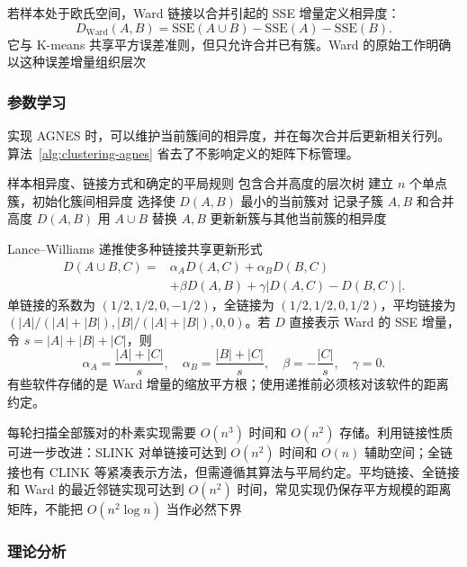 若样本处于欧氏空间，Ward 链接以合并引起的 SSE 增量定义相异度：
\[
 D_{\mathrm{Ward}}(A,B)
 =\mathrm{SSE}(A\cup B)-\mathrm{SSE}(A)-\mathrm{SSE}(B).
\]
它与 K-means 共享平方误差准则，但只允许合并已有簇。Ward 的原始工作明确以这种误差增量组织层次

\subsubsection{参数学习}

实现 AGNES 时，可以维护当前簇间的相异度，并在每次合并后更新相关行列。算法~\ref{alg:clustering-agnes} 省去了不影响定义的矩阵下标管理。

\begin{algorithm}[凝聚层次聚类]
 \label{alg:clustering-agnes}
 \begin{algorithmic}[1]
 \Require 样本相异度、链接方式和确定的平局规则
 \Ensure 包含合并高度的层次树
 \State 建立 $n$ 个单点簇，初始化簇间相异度
  \State 选择使 $D(A,B)$ 最小的当前簇对
  \State 记录子簇 $A,B$ 和合并高度 $D(A,B)$
  \State 用 $A\cup B$ 替换 $A,B$
  \State 更新新簇与其他当前簇的相异度
 \EndWhile
 \end{algorithmic}
\end{algorithm}

Lance--Williams 递推使多种链接共享更新形式
\begin{equation}
 \begin{aligned}
 D(A\cup B,C)={}&\alpha_A D(A,C)+\alpha_B D(B,C)\\
 &+\beta D(A,B)
 +\gamma|D(A,C)-D(B,C)|.
 \end{aligned}
 \label{eq:clustering-lance-williams}
\end{equation}
单链接的系数为 $(1/2,1/2,0,-1/2)$，全链接为 $(1/2,1/2,0,1/2)$，平均链接为 $(|A|/(|A|+|B|),|B|/(|A|+|B|),0,0)$。若 $D$ 直接表示 Ward 的 SSE 增量，令 $s=|A|+|B|+|C|$，则
\[
 \alpha_A=\frac{|A|+|C|}{s},\quad
 \alpha_B=\frac{|B|+|C|}{s},\quad
 \beta=-\frac{|C|}{s},\quad \gamma=0.
\]
有些软件存储的是 Ward 增量的缩放平方根；使用递推前必须核对该软件的距离约定。

每轮扫描全部簇对的朴素实现需要 $O(n^3)$ 时间和 $O(n^2)$ 存储。利用链接性质可进一步改进：SLINK 对单链接可达到 $O(n^2)$ 时间和 $O(n)$ 辅助空间；全链接也有 CLINK 等紧凑表示方法，但需遵循其算法与平局约定。平均链接、全链接和 Ward 的最近邻链实现可达到 $O(n^2)$ 时间，常见实现仍保存平方规模的距离矩阵，不能把 $O(n^2\log n)$ 当作必然下界

\subsubsection{理论分析}

